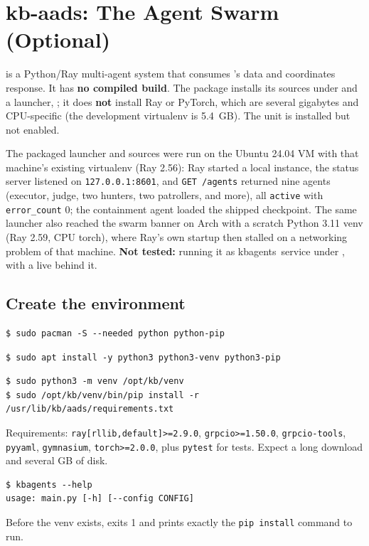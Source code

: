 \chapter{kb-aads: The Agent Swarm (Optional)}
\label{ch:aads}
 is a Python/Ray multi-agent system that consumes 's data and coordinates response. It has
\textbf{no compiled build}. The package installs its sources under  and a launcher,
; it does \textbf{not} install Ray or PyTorch, which are several gigabytes and CPU-specific
(the development virtualenv is 5.4~GB). The unit is installed but not enabled.

\begin{kbnote}
The packaged launcher and sources were run on the Ubuntu 24.04 VM with that machine's existing virtualenv
(Ray 2.56): Ray started a local instance, the status server listened on \texttt{127.0.0.1:8601}, and
\texttt{GET /agents} returned nine agents (executor, judge, two hunters, two patrollers, and more), all
\texttt{active} with \texttt{error\_count} 0; the containment agent loaded the shipped checkpoint. The same launcher
also reached the swarm banner on Arch with a scratch Python 3.11 venv (Ray 2.59, CPU torch), where Ray's own
startup then stalled on a networking problem of that machine. \textbf{Not tested:} running it as
\unit{kbagents.service} under , with a live  behind it.
\end{kbnote}

\section{Create the environment}
\resetsteps
{}
\ifarch
\begin{lstlisting}[style=console]
$ sudo pacman -S --needed python python-pip
\end{lstlisting}
\else
\begin{lstlisting}[style=console]
$ sudo apt install -y python3 python3-venv python3-pip
\end{lstlisting}
\fi
{}
\begin{lstlisting}[style=console]
$ sudo python3 -m venv /opt/kb/venv
$ sudo /opt/kb/venv/bin/pip install -r /usr/lib/kb/aads/requirements.txt
\end{lstlisting}
Requirements: \texttt{ray[rllib,default]>=2.9.0}, \texttt{grpcio>=1.50.0}, \texttt{grpcio-tools}, \texttt{pyyaml}, \texttt{gymnasium},
\texttt{torch>=2.0.0}, plus \texttt{pytest} for tests. Expect a long download and several GB of disk.
\begin{lstlisting}[style=console]
$ kbagents --help
usage: main.py [-h] [--config CONFIG]
\end{lstlisting}
Before the venv exists,  exits 1 and prints exactly the \texttt{pip install} command to run.

